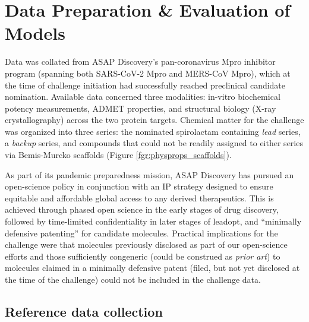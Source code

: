 \documentclass[journal=jcim,manuscript=article]{achemso}
\begin{document}
\section{Data Preparation \& Evaluation of Models}

Data was collated from ASAP Discovery’s pan-coronavirus Mpro inhibitor program (spanning both SARS-CoV-2 Mpro and MERS-CoV Mpro), which at the time of challenge initiation had successfully reached preclinical candidate nomination. Available data concerned three modalities: in-vitro biochemical potency measurements, ADMET properties, and structural biology (X-ray crystallography) across the two protein targets. Chemical matter for the challenge was organized into three series: the nominated spirolactam containing \textit{lead} series, a \textit{backup} series, and compounds that could not be readily assigned to either series via Bemis-Murcko scaffolds\cite{bemis_murcko_1996} (Figure \ref{fgr:physprops_scaffolds}). 

As part of its pandemic preparedness mission, ASAP Discovery has pursued an open-science policy in conjunction with an IP strategy designed to ensure equitable and affordable global access to any derived therapeutics. This is achieved through phased open science in the early stages of drug discovery, followed by time-limited confidentiality in later stages of leadopt, and “minimally defensive patenting” for candidate molecules\cite{griffen_2024}. Practical implications for the challenge were that molecules previously disclosed as part of our open-science efforts and those sufficiently congeneric (could be construed as \textit{prior art}\cite{ACS_patents}) to molecules claimed in a minimally defensive patent (filed, but not yet disclosed at the time of the challenge) could not be included in the challenge data.

\subsection{Reference data collection}
\end{document}
